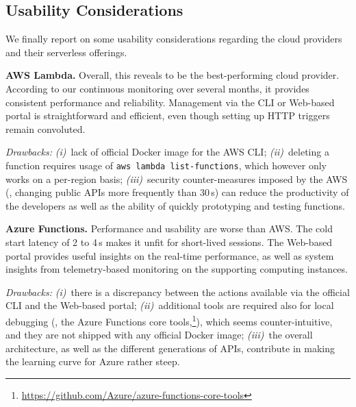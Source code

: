 \subsection{Usability Considerations}

We finally report on some usability considerations regarding the cloud providers and their serverless offerings.

\textbf{AWS Lambda.}
Overall, this reveals to be the best-performing cloud provider. 
According to our continuous monitoring over several months, it provides consistent performance and reliability.
Management via the \gls{CLI} or Web-based portal is straightforward and efficient, even though setting up HTTP triggers remain convoluted.

\emph{Drawbacks:} 
\emph{(i)}~lack of official Docker image for the \gls{AWS} \gls{CLI}; 
\emph{(ii)}~deleting a function requires usage of \texttt{aws lambda list-functions}, which however only works on a per-region basis;
\emph{(iii)}~security counter-measures imposed by the AWS (\eg, changing public APIs more frequently than 30\,s) can reduce the productivity of the developers as well as the ability of quickly prototyping and testing functions.

\textbf{Azure Functions.}
Performance and usability are worse than AWS. 
The cold start latency of 2 to 4\,s makes it unfit for short-lived sessions. %
The Web-based portal provides useful insights on the real-time performance, as well as system insights from telemetry-based monitoring on the supporting computing instances.

\emph{Drawbacks:} 
\emph{(i)}~there is a discrepancy between the actions available via the official CLI and the Web-based portal;
\emph{(ii)}~additional tools are required also for local debugging (\eg, the Azure Functions core tools,\footnote{\url{https://github.com/Azure/azure-functions-core-tools}}), which seems counter-intuitive, and they are not shipped with any official Docker image;
\emph{(iii)}~the overall architecture, as well as the different generations of APIs, contribute in making the learning curve for Azure rather steep.


